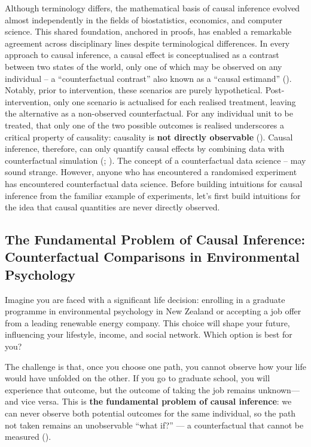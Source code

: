 \documentclass[
  singlecolumn]{article}
\begin{document}
Although terminology differs, the mathematical basis of causal inference
evolved almost independently in the fields of biostatistics, economics,
and computer science. This shared foundation, anchored in proofs, has
enabled a remarkable agreement across disciplinary lines despite
terminological differences. In every approach to causal inference, a
causal effect is conceptualised as a contrast between two states of the
world, only one of which may be observed on any individual -- a
``counterfactual contrast'' also known as a ``causal estimand''
(). Notably,
prior to intervention, these scenarios are purely hypothetical.
Post-intervention, only one scenario is actualised for each realised
treatment, leaving the alternative as a non-observed counterfactual. For
any individual unit to be treated, that only one of the two possible
outcomes is realised underscores a critical property of causality:
causality is \textbf{not directly observable}
(). Causal inference, therefore, can
only quantify causal effects by combining data with counterfactual
simulation (;
). The concept of
a counterfactual data science -- may sound strange. However, anyone who
has encountered a randomised experiment has encountered counterfactual
data science. Before building intuitions for causal inference from the
familiar example of experiments, let's first build intuitions for the
idea that causal quantities are never directly observed.

\subsection{The Fundamental Problem of Causal Inference: Counterfactual
Comparisons in Environmental
Psychology}\label{the-fundamental-problem-of-causal-inference-counterfactual-comparisons-in-environmental-psychology}

Imagine you are faced with a significant life decision: enrolling in a
graduate programme in environmental psychology in New Zealand or
accepting a job offer from a leading renewable energy company. This
choice will shape your future, influencing your lifestyle, income, and
social network. Which option is best for you?

The challenge is that, once you choose one path, you cannot observe how
your life would have unfolded on the other. If you go to graduate
school, you will experience that outcome, but the outcome of taking the
job remains unknown---and vice versa. This is \textbf{the fundamental
problem of causal inference}: we can never observe both potential
outcomes for the same individual, so the path not taken remains an
unobservable ``what if?'' --- a counterfactual that cannot be measured
().
\end{document}
